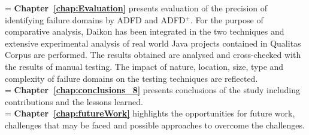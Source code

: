 \hangindent=\parindent
{}
\noindent
\textbf{Chapter~\ref{chap:Evaluation}} presents evaluation of the precision of identifying failure domains by ADFD and ADFD$^+$. For the purpose of comparative analysis, Daikon has been integrated in the two techniques and extensive experimental analysis of real world Java projects contained in Qualitas Corpus are performed. The results obtained are analysed and cross-checked with the results of manual testing. The impact of nature, location, size, type and complexity of failure domains on the testing techniques are reflected. \\

\hangindent=\parindent
{}
\noindent
\textbf{Chapter~\ref{chap:conclusions_8}} presents conclusions of the study including contributions and the lessons learned.\\

\hangindent=\parindent
{}
\noindent
\textbf{Chapter~\ref{chap:futureWork}} highlights the opportunities for future work, challenges that may be faced and possible approaches to overcome the challenges.



